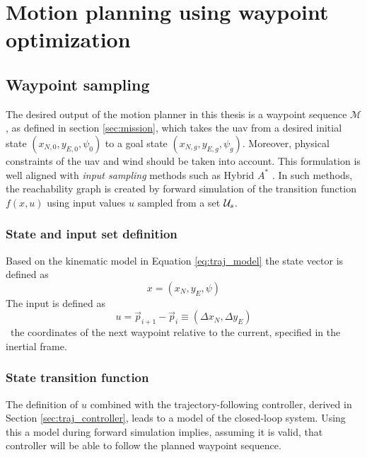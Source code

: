 \chapter{Motion planning using waypoint optimization}\label{cha:motion_planning_fw}
\section{Waypoint sampling}
The desired output of the motion planner in this thesis is a waypoint sequence $\mathcal{M}$, as defined in section \ref{sec:mission},
which takes the \ac{uav} from a desired initial state $(x_{N,0},y_{E,0},\psi_0)$ to a goal state $(x_{N,g},y_{E,g},\psi_g)$. Moreover, physical constraints of the \ac{uav} and wind should be taken into account. This formulation is well aligned with \textit{input sampling} methods such as Hybrid $A^*$ \cite{hybrid_astar}. 
In such methods, the reachability graph is created by forward simulation of the transition function $f(x, u)$ using input values $u$ sampled from a 
set $\mathcal{U}_s$. 

\subsection{State and input set definition}
Based on the kinematic model in Equation \eqref{eq:traj_model} the state vector is defined as
\begin{equation}
    x=(x_N, y_E, \psi)
\end{equation}
The input is defined as 
\begin{equation}
    u=\vec{p}_{i+1}-\vec{p}_i\equiv(\Delta x_N, \Delta y_E)
\end{equation}
\ie\ the coordinates of the next waypoint relative to the current, specified in the inertial frame.
\subsection{State transition function}
The definition of $u$ combined with the trajectory-following controller, derived in Section \ref{sec:traj_controller}, 
leads to a model of the closed-loop system. Using this a model during forward simulation implies, assuming it is valid, that controller will be able to follow the planned waypoint sequence. 

